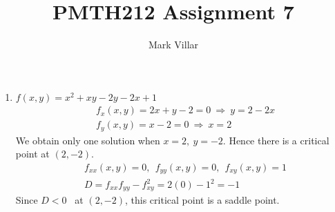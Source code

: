 \documentclass[12pt]{amsart}
\title{PMTH212 Assignment 7}
\author{Mark Villar}
\begin{document}
 

\maketitle 

\begin{enumerate}
	
	\item $f(x,y)=x^2+xy-2y-2x+1$
		\begin{align*}
			&f_x(x,y)=2x+y-2=0 \ \Rightarrow \ y=2-2x \\
			&f_y(x,y)=x-2=0 \ \Rightarrow \ x=2
		\end{align*}
		We obtain only one solution when $x=2, \ y=-2$. Hence there is a critical point  at $(2,-2)$.
		\begin{align*}
			&f_{xx}(x,y)=0, \ \ f_{yy}(x,y)=0, \ \ f_{xy}(x,y)=1 \\
			&D=f_{xx}f_{yy}-f^2_{xy}=2(0)-1^2=-1
		\end{align*}
		Since $D<0$ \ at $(2,-2)$, this critical point is a saddle point.
		
		\medskip
		

\end{enumerate}
\end{document}
